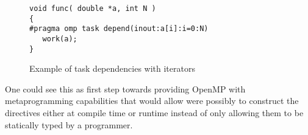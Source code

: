 \begin{figure}
\begin{verbatim}
void func( double *a, int N )
{
#pragma omp task depend(inout:a[i]:i=0:N)
   work(a);
}
\end{verbatim}
\caption{Example of task dependencies with iterators}
\label{fig:iterators}
\end{figure}
   
One could see this as first step towards providing OpenMP with metaprogramming
capabilities that would allow were possibly to construct the directives either
at compile time or runtime instead of only allowing them to be statically typed
by a programmer.
   

